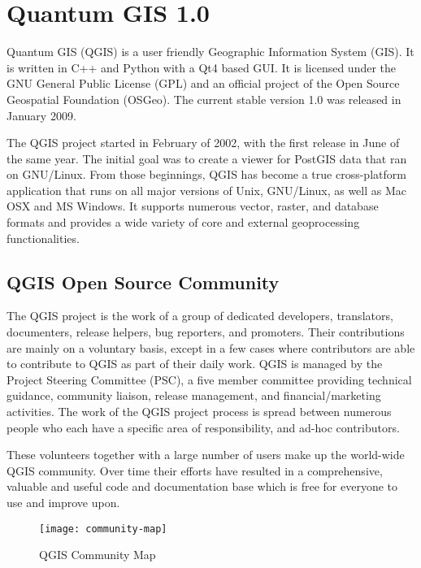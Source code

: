 \section{Quantum GIS 1.0}
\setcounter{page}{1}

Quantum GIS (QGIS) is a user friendly Geographic Information System (GIS).
It is written in C++ and Python with a Qt4 based GUI. It is licensed under the
GNU General Public License (GPL) and an official project of the Open Source
Geospatial Foundation (OSGeo). The current stable version 1.0 was released in
January 2009. 


The QGIS project started in February of 2002, with the first release in June
of the same year. The initial goal was to create a viewer for PostGIS data
that ran on GNU/Linux. From those beginnings, QGIS has become a true
cross-platform application that runs on all major versions of Unix,
GNU/Linux, as well as Mac OSX and MS Windows. It supports numerous vector,
raster, and database formats and provides a wide variety of core and external
geoprocessing functionalities.

\subsection{QGIS Open Source Community}

The QGIS project is the work of a group of dedicated developers,
translators, documenters, release helpers, bug reporters, and promoters. Their 
contributions are mainly on a voluntary basis, except in a few cases where 
contributors are able to contribute to QGIS as part of their daily work. QGIS 
is managed by the Project Steering Committee (PSC), a five member committee
providing technical guidance, community liaison, release management, and
financial/marketing activities. The work of the QGIS project process is
spread between numerous people who each have a specific area of
responsibility, and ad-hoc contributors.

These volunteers together with a large number of users make up the
world-wide QGIS community. Over time their efforts have resulted in a comprehensive,
valuable and useful code and documentation base which is free for everyone 
to use and improve upon.

\begin{figure}[h]
   \begin{center}
   \caption{QGIS Community Map}\label{fig:community-map}\smallskip
   \texttt{[image: community-map]}
\end{center}
\end{figure}

